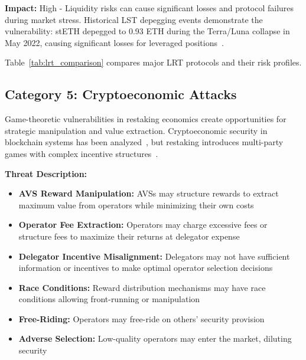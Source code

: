\documentclass[runningheads]{llncs}
\begin{document}
\textbf{Impact:} High - Liquidity risks can cause significant losses and protocol failures during market stress. Historical LST depegging events demonstrate the vulnerability: stETH depegged to 0.93 ETH during the Terra/Luna collapse in May 2022, causing significant losses for leveraged positions~\cite{trailofbits2023staking}.

Table~\ref{tab:lrt_comparison} compares major LRT protocols and their risk profiles.

\subsection{Category 5: Cryptoeconomic Attacks}

Game-theoretic vulnerabilities in restaking economics create opportunities for strategic manipulation and value extraction. Cryptoeconomic security in blockchain systems has been analyzed~\cite{zhou2020high,chen2021sok}, but restaking introduces multi-party games with complex incentive structures~\cite{durvasula2024robust}.

\textbf{Threat Description:}
\begin{itemize}
    \item \textbf{AVS Reward Manipulation:} AVSs may structure rewards to extract maximum value from operators while minimizing their own costs
    \item \textbf{Operator Fee Extraction:} Operators may charge excessive fees or structure fees to maximize their returns at delegator expense
    \item \textbf{Delegator Incentive Misalignment:} Delegators may not have sufficient information or incentives to make optimal operator selection decisions
    \item \textbf{Race Conditions:} Reward distribution mechanisms may have race conditions allowing front-running or manipulation
    \item \textbf{Free-Riding:} Operators may free-ride on others' security provision
    \item \textbf{Adverse Selection:} Low-quality operators may enter the market, diluting security
\end{itemize}
\end{document}
